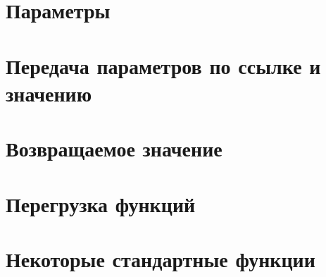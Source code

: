 \documentclass[book.tex]{subfiles}
\begin{document}

\section*{Параметры}

\section*{Передача параметров по ссылке и значению}

\section*{Возвращаемое значение}

\section*{Перегрузка функций}

\section*{Некоторые стандартные функции}
\end{document}
